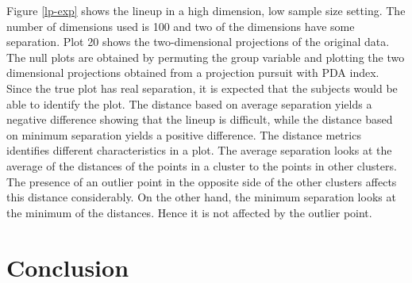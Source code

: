 \documentclass[12]{article}
\begin{document}
Figure \ref{lp-exp} shows the lineup in a high dimension, low sample size setting. The number of dimensions used is 100 and two of the dimensions have some separation. Plot 20 shows the two-dimensional projections of the original data. The null plots are obtained by permuting the group variable and plotting the two dimensional projections obtained from a projection pursuit with PDA index. Since the true plot has real separation, it is expected that the subjects would be able to identify the plot. The distance based on average separation yields a negative difference showing that the lineup is difficult, while the distance based on minimum separation yields a positive difference. The distance metrics identifies different characteristics in a plot. The average separation looks at the average of the distances of the points in a cluster to the points in other clusters. The presence of an outlier point in the opposite side of the other clusters affects this distance considerably. On the other hand, the minimum separation looks at the minimum of the distances. Hence it is not affected by the outlier point. 


\section{Conclusion}
\end{document}
